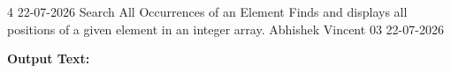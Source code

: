 \clearpage
\label{prog:04}
\programhead
  {4}
  {22-07-2026}
  {Search All Occurrences of an Element}
  {Finds and displays all positions of a given element in an integer array.}
  {Abhishek Vincent}
  {03}
  {22-07-2026}

\divider
\textbf{Output Text:}\par
\vspace{2pt}

